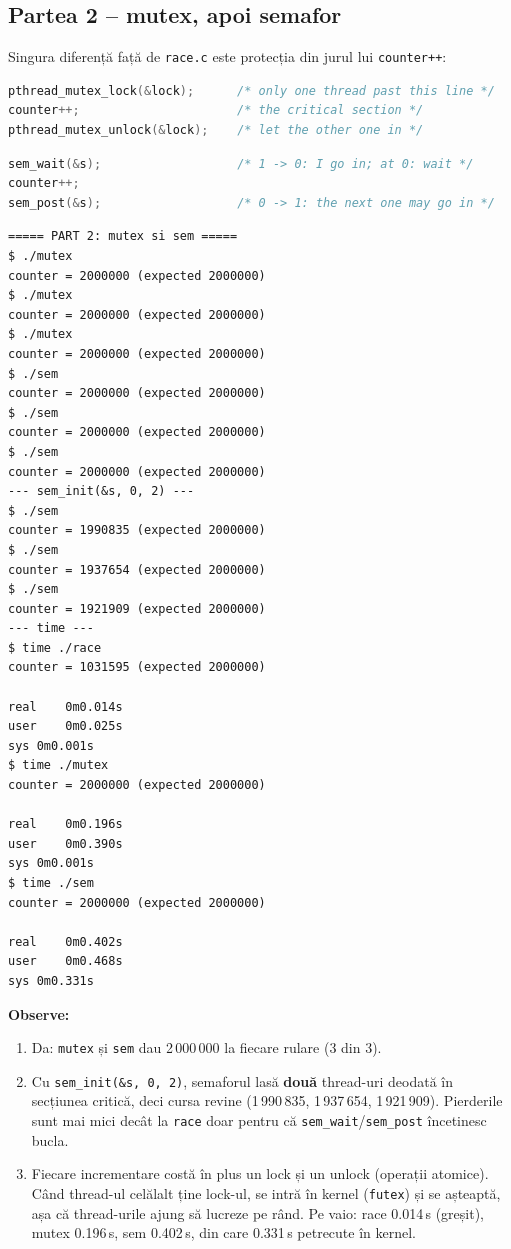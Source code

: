 \documentclass[12pt,a4paper]{article}
\begin{document}
\subsection{Partea 2 -- mutex, apoi semafor}
Singura diferență față de \texttt{race.c} este protecția din jurul lui \texttt{counter++}:
\begin{lstlisting}[language=C,caption={mutex.c -- sectiunea critica}]
pthread_mutex_lock(&lock);      /* only one thread past this line */
counter++;                      /* the critical section */
pthread_mutex_unlock(&lock);    /* let the other one in */
\end{lstlisting}
\begin{lstlisting}[language=C,caption={sem.c -- acelasi lock, din semafor (sem\_init(\&s, 0, 1))}]
sem_wait(&s);                   /* 1 -> 0: I go in; at 0: wait */
counter++;
sem_post(&s);                   /* 0 -> 1: the next one may go in */
\end{lstlisting}
\begin{lstlisting}[caption={mutex, sem, sem cu start 2 și timpii de execuție}]
===== PART 2: mutex si sem =====
$ ./mutex
counter = 2000000 (expected 2000000)
$ ./mutex
counter = 2000000 (expected 2000000)
$ ./mutex
counter = 2000000 (expected 2000000)
$ ./sem
counter = 2000000 (expected 2000000)
$ ./sem
counter = 2000000 (expected 2000000)
$ ./sem
counter = 2000000 (expected 2000000)
--- sem_init(&s, 0, 2) ---
$ ./sem
counter = 1990835 (expected 2000000)
$ ./sem
counter = 1937654 (expected 2000000)
$ ./sem
counter = 1921909 (expected 2000000)
--- time ---
$ time ./race
counter = 1031595 (expected 2000000)

real	0m0.014s
user	0m0.025s
sys	0m0.001s
$ time ./mutex
counter = 2000000 (expected 2000000)

real	0m0.196s
user	0m0.390s
sys	0m0.001s
$ time ./sem
counter = 2000000 (expected 2000000)

real	0m0.402s
user	0m0.468s
sys	0m0.331s
\end{lstlisting}

\textbf{Observe:}
\begin{enumerate}
    \item Da: \texttt{mutex} și \texttt{sem} dau 2\,000\,000 la fiecare rulare (3 din 3).
    \item Cu \texttt{sem\_init(\&s, 0, 2)}, semaforul lasă \textbf{două} thread-uri deodată în secțiunea critică, deci cursa revine (1\,990\,835, 1\,937\,654, 1\,921\,909). Pierderile sunt mai mici decât la \texttt{race} doar pentru că \texttt{sem\_wait}/\texttt{sem\_post} încetinesc bucla.
    \item Fiecare incrementare costă în plus un lock și un unlock (operații atomice). Când thread-ul celălalt ține lock-ul, se intră în kernel (\texttt{futex}) și se așteaptă, așa că thread-urile ajung să lucreze pe rând. Pe vaio: race 0.014\,s (greșit), mutex 0.196\,s, sem 0.402\,s, din care 0.331\,s petrecute în kernel.
\end{enumerate}
\end{document}
